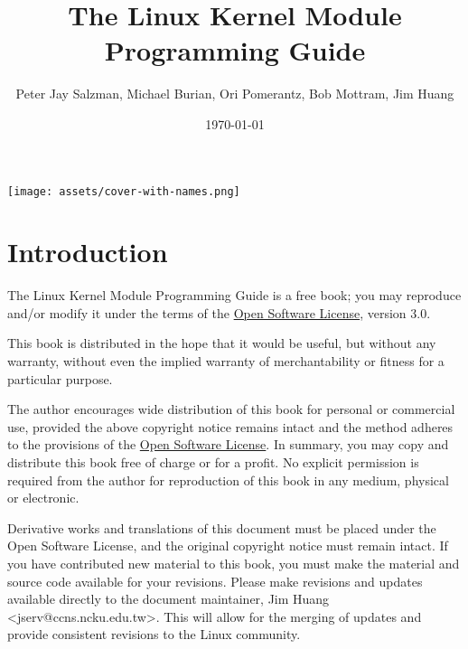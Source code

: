 \documentclass[10pt, oneside]{book}
\author{Peter Jay Salzman, Michael Burian, Ori Pomerantz, Bob Mottram, Jim Huang}
\date{\today}
\title{The Linux Kernel Module Programming Guide}
\begin{document}
\maketitle
\ifdefined\HCode
\texttt{[image: assets/cover-with-names.png]}
\else
\pagestyle{empty}
\tableofcontents
\fi

\section{Introduction}
\label{sec:introduction}
The Linux Kernel Module Programming Guide is a free book; you may reproduce and/or modify it under the terms of the \href{https://opensource.org/licenses/OSL-3.0}{Open Software License}, version 3.0.

This book is distributed in the hope that it would be useful, but without any warranty, without even the implied warranty of merchantability or fitness for a particular purpose.

The author encourages wide distribution of this book for personal or commercial use, provided the above copyright notice remains intact and the method adheres to the provisions of the \href{https://opensource.org/licenses/OSL-3.0}{Open Software License}.
In summary, you may copy and distribute this book free of charge or for a profit. No explicit permission is required from the author for reproduction of this book in any medium, physical or electronic.

Derivative works and translations of this document must be placed under the Open Software License, and the original copyright notice must remain intact.
If you have contributed new material to this book, you must make the material and source code available for your revisions.
Please make revisions and updates available directly to the document maintainer, Jim Huang <jserv@ccns.ncku.edu.tw>.
This will allow for the merging of updates and provide consistent revisions to the Linux community.
\end{document}
